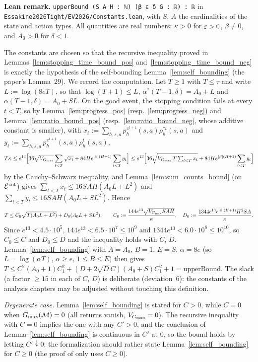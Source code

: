 \textbf{Lean remark.} \texttt{upperBound (S A H : ℕ) (β ε δ G : ℝ) : ℝ} in
\texttt{Essakine2026Tight/EV2026/Constants.lean}, with $S$, $A$ the cardinalities of the
state and action types. All quantities are real numbers; $\kappa > 0$ for $\varepsilon > 0$, $\beta \ne 0$,
and $A_0 > 0$ for $\delta < 1$.

\begin{remark}\label{rem:sc_constants}
The constants are chosen so that the recursive inequality proved in
Lemmas~\ref{lem:stopping_time_bound_pos} and~\ref{lem:stopping_time_bound_neg} is exactly the
hypothesis of the self-bounding Lemma~\ref{lem:self_bounding} (the paper's Lemma~29). We
record the computation. Let $T \ge 1$ with $T \le \tau$ and write $L := \log(8eT)$, so that
$\log(T+1) \le L$, $\alpha^*(T-1,\delta) = A_0 + L$ and $\alpha(T-1,\delta) = A_0 + SL$. On the
good event, the stopping condition fails at every $t < T$, so by
Lemma~\ref{lem:progress_pos} (resp.~\ref{lem:progress_neg}) and
Lemma~\ref{lem:ratio_bound_pos} (resp.~\ref{lem:ratio_bound_neg}, whose additive constant is
smaller), with $x_t := \sum_{h,s,a} p^{\pi^{t+1}}_h(s,a)\rho^{*t}_h(s,a)$ and
$y_t := \sum_{h,s,a} p^{\pi^{t+1}}_h(s,a)\rho^t_h(s,a)$,
\[
  T\kappa \le e^{13}\Big[36\sqrt{V_{G_{\max}}}\sum_{t<T}\sqrt{x_t} + 84 H e^{|\beta|(H+1)}\sum_{t<T} y_t\Big]
  \le e^{13}\Big[36\sqrt{V_{G_{\max}}\, T \textstyle\sum_{t<T} x_t} + 84 H e^{|\beta|(H+1)}\sum_{t<T} y_t\Big]
\]
by the Cauchy--Schwarz inequality, and Lemma~\ref{lem:sum_counts_bound} (on $\mathcal{E}^{\mathrm{cnt}}$) gives
$\sum_{t<T} x_t \le 16 SAH(A_0 L + L^2)$ and $\sum_{t<T} y_t \le 16SAH(A_0 L + S L^2)$. Hence
\[
  T \le C_0\sqrt{T(A_0 L + L^2)} + D_0 (A_0 L + S L^2), \qquad
  C_0 := \frac{144 e^{13}\sqrt{V_{G_{\max}} SAH}}{\kappa}, \quad
  D_0 := \frac{1344 e^{13} e^{|\beta|(H+1)} H^2 SA}{\kappa}.
\]
Since $e^{13} < 4.5\cdot 10^5$, $144 e^{13} < 6.5\cdot 10^7 \le 10^9$ and
$1344 e^{13} < 6.0\cdot 10^8 \le 10^{10}$, so $C_0 \le C$ and $D_0 \le D$ and the inequality holds
with $C$, $D$. Lemma~\ref{lem:self_bounding} with $A = A_0$, $B = 1$, $E = S$, $\alpha = 8e$
(so $L = \log(\alpha T)$, $\alpha \ge e$, $1 \le B \le E$) then gives
$T \le C^2(A_0 + 1)C_1^2 + (D + 2\sqrt D C)(A_0+S)C_1^2 + 1 = \mathrm{upperBound}$.
The slack (a factor $\ge 15$ in each of $C$, $D$) is deliberate (deviation~6): the constants of
the analysis chapters may be adjusted without touching this definition.

\emph{Degenerate case.} Lemma~\ref{lem:self_bounding} is stated for $C > 0$, while
$C = 0$ when $G_{\max}(\mathcal M) = 0$ (all returns vanish, $V_{G_{\max}} = 0$). The recursive
inequality with $C = 0$ implies the one with any $C' > 0$, and the conclusion of
Lemma~\ref{lem:self_bounding} is continuous in $C'$ at $0$, so the bound holds by letting
$C' \downarrow 0$; the formalization should rather state Lemma~\ref{lem:self_bounding} for
$C \ge 0$ (the proof of \cite[Lemma~13]{menard2021fast} only uses $C \ge 0$).


\end{remark}
